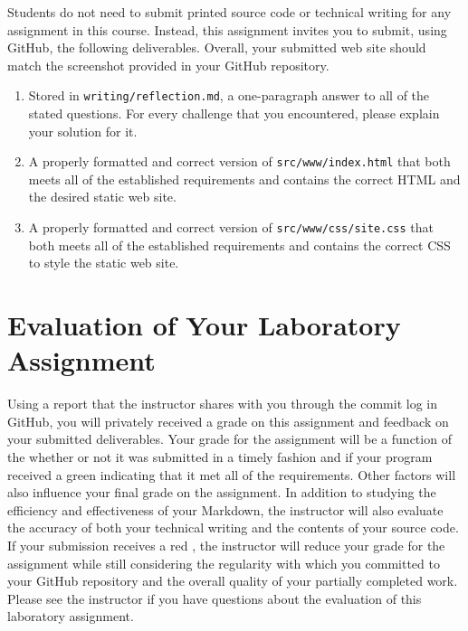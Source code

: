 \documentclass[11pt]{article}
\newcommand{\mainprogramsource}{\lstinline{src/www/index.html}}
\newcommand{\secondprogramsource}{\lstinline{src/www/css/site.css}}
\newcommand{\reflection}{\lstinline{writing/reflection.md}}
\newcommand{\checkmark}{\ding{51}}
\newcommand{\naughtmark}{\ding{55}}
\begin{document}
\noindent Students do not need to submit printed source code or technical
writing for any assignment in this course. Instead, this assignment invites you
to submit, using GitHub, the following deliverables. Overall, your submitted web
site should match the screenshot provided in your GitHub repository.

\begin{enumerate}

  \setlength{\itemsep}{0in}

\item Stored in \reflection{}, a one-paragraph answer to all of the stated
  questions. For every challenge that you encountered, please explain your
  solution for it.

\item A properly formatted and correct version of \mainprogramsource{} that both
  meets all of the established requirements and contains the correct HTML and
  the desired static web site.

\item A properly formatted and correct version of \secondprogramsource{} that
  both meets all of the established requirements and contains the correct CSS to
  style the static web site.

\end{enumerate}

\section*{Evaluation of Your Laboratory Assignment}

Using a report that the instructor shares with you through the commit log in GitHub, you will privately received a grade
on this assignment and feedback on your submitted deliverables. Your grade for the assignment will be a function of the
whether or not it was submitted in a timely fashion and if your program received a green \checkmark{} indicating that it
met all of the requirements. Other factors will also influence your final grade on the assignment. In addition to
studying the efficiency and effectiveness of your Markdown, the instructor will also evaluate the accuracy of both your
technical writing and the contents of your source code. If your submission receives a red \naughtmark{}, the instructor
will reduce your grade for the assignment while still considering the regularity with which you committed to your GitHub
repository and the overall quality of your partially completed work. Please see the instructor if you have questions
about the evaluation of this laboratory assignment.
\end{document}
